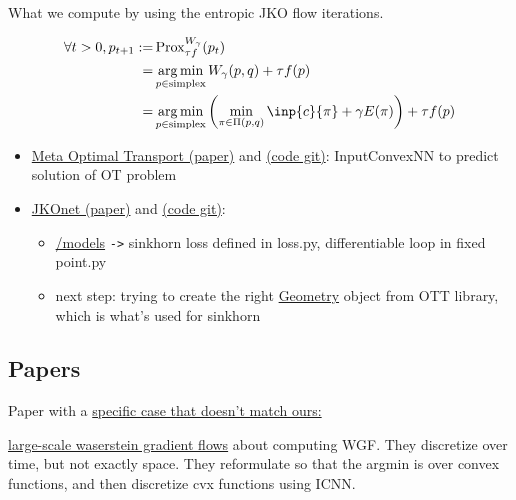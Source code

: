 What we compute by using the entropic JKO flow iterations.

\begin{align}
	\forall t > 0, p_{t+1} := & \prox^{W_{\gamma}}_{\tau f}(p_t) \\
							= & \argmin_{p \in \text{simplex}} W_{\gamma}(p, q) + \tau f(p) \\
							= &\argmin_{p \in \text{simplex}}  \left( \min_{\pi \in \Pi(p, q)} \inp{c}{\pi} + \gamma E(\pi) \right) + \tau f(p)
\end{align}


\begin{itemize}
	\item \href{https://arxiv.org/pdf/2206.05262.pdf}{Meta Optimal Transport (paper)} and \href{https://github.com/facebookresearch/meta-ot}{(code git)}: InputConvexNN to predict solution of OT problem
	\item \href{https://arxiv.org/pdf/2106.06345.pdf}{JKOnet (paper)} and \href{https://github.com/bunnech/jkonet}{(code git)}:
		\begin{itemize}
			\item \href{https://github.com/bunnech/jkonet/tree/main/jkonet/models}{/models} \verb|->| sinkhorn loss defined in loss.py, differentiable loop in fixed point.py
			\item next step: trying to create the right \href{https://ott-jax.readthedocs.io/en/latest/_autosummary/ott.geometry.geometry.Geometry.html#ott.geometry.geometry.Geometry}{Geometry} object from OTT library, which is what's used for sinkhorn
		\end{itemize}
\end{itemize}

\subsection{Papers}


Paper with a \href{https://arxiv.org/pdf/1512.02783.pdf}{specific case that doesn't match ours:} 

\href{https://arxiv.org/pdf/2106.00736.pdf}{large-scale waserstein gradient flows} about computing WGF. They discretize over time, but not exactly space. They reformulate so that the argmin is over convex functions, and then discretize cvx functions using ICNN.

